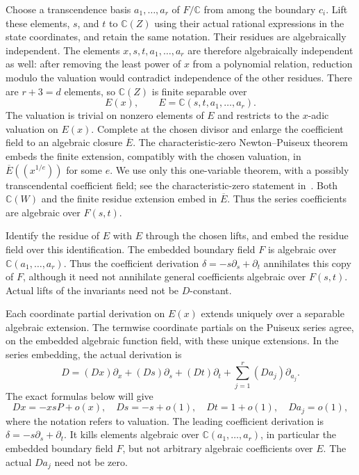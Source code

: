 \documentclass[11pt]{article}
\theoremstyle{remark}\newtheorem{remark}[theorem]{Remark}
\newcommand{\C}{\mathbb C}
\begin{document}
Choose a transcendence basis $a_1,\ldots,a_r$ of $F/\C$ from among the boundary $c_i$. Lift these elements, $s$, and $t$ to $\C(Z)$ using their actual rational expressions in the state coordinates, and retain the same notation. Their residues are algebraically independent. The elements $x,s,t,a_1,\ldots,a_r$ are therefore algebraically independent as well: after removing the least power of $x$ from a polynomial relation, reduction modulo the valuation would contradict independence of the other residues. There are $r+3=d$ elements, so $\C(Z)$ is finite separable over
\[
 E(x),\qquad E=\C(s,t,a_1,\ldots,a_r).
\]
The valuation is trivial on nonzero elements of $E$ and restricts to the $x$-adic valuation on $E(x)$. Complete at the chosen divisor and enlarge the coefficient field to an algebraic closure $\overline E$. The characteristic-zero Newton--Puiseux theorem embeds the finite extension, compatibly with the chosen valuation, in $\overline E((x^{1/e}))$ for some $e$. We use only this one-variable theorem, with a possibly transcendental coefficient field; see the characteristic-zero statement in~\cite{Poonen}. Both $\C(W)$ and the finite residue extension embed in $\overline E$. Thus the series coefficients are algebraic over $F(s,t)$.

Identify the residue of $E$ with $E$ through the chosen lifts, and embed the residue field over this identification. The embedded boundary field $F$ is algebraic over $\C(a_1,\ldots,a_r)$. Thus the coefficient derivation $\delta=-s\partial_s+\partial_t$ annihilates this copy of $F$, although it need not annihilate general coefficients algebraic over $F(s,t)$. Actual lifts of the invariants need not be $D$-constant.

Each coordinate partial derivation on $E(x)$ extends uniquely over a separable algebraic extension. The termwise coordinate partials on the Puiseux series agree, on the embedded algebraic function field, with these unique extensions. In the series embedding, the actual derivation is
\begin{equation}\label{eq:fullD}
 D=(Dx)\partial_x+(Ds)\partial_s+(Dt)\partial_t
       +\sum_{j=1}^r(Da_j)\partial_{a_j}.
\end{equation}
The exact formulas below will give
\begin{equation}\label{eq:leadingD}
 Dx=-xsP+o(x),\quad Ds=-s+o(1),\quad Dt=1+o(1),
 \quad Da_j=o(1),
\end{equation}
where the notation refers to valuation. The leading coefficient derivation is $\delta=-s\partial_s+\partial_t$. It kills elements algebraic over $\C(a_1,\ldots,a_r)$, in particular the embedded boundary field $F$, but not arbitrary algebraic coefficients over $E$. The actual $Da_j$ need not be zero.
\end{document}
